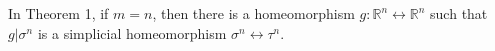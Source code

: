 In Theorem 1, if $m = n$, then there is a homeomorphism $g: \mathbb{R}^n \leftrightarrow \mathbb{R}^n$ such that $g|\sigma^n$ is a simplicial homeomorphism $\sigma^n \leftrightarrow \tau^n$.
